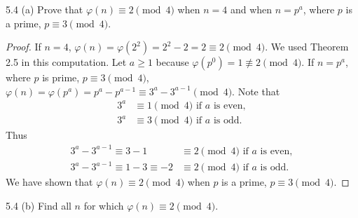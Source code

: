 \begin{exercise}{5.4 (a)}
  Prove that \( \varphi(n) \equiv 2 \pmod{4} \) when \( n = 4 \) and
  when \( n = p^a \), where \( p \) is a prime, \( p \equiv 3
  \pmod{4} \).
\end{exercise}

\begin{proof}
  If \( n = 4 \), \( \varphi(n) = \varphi(2^2) = 2^2 - 2 = 2 \equiv 2
  \pmod{4} \). We used Theorem 2.5 in this computation. Let \( a \ge 1
  \) because \( \varphi(p^0) = 1 \not\equiv 2 \pmod{4} \). If \( n =
  p^a \), where \( p \) is prime, \( p \equiv 3 \pmod{4} \), \(
  \varphi(n) = \varphi(p^a) = p^a - p^{a - 1} \equiv 3^a - 3^{a - 1}
  \pmod{4} \). Note that
  \begin{align*}
    3^a & \equiv 1 \pmod{4} \text{ if } a \text{ is even}, \\
    3^a & \equiv 3 \pmod{4} \text{ if } a \text{ is odd}.
  \end{align*}
  Thus
  \begin{align*}
    3^a - 3^{a - 1} \equiv 3 - 1 & \equiv 2 \pmod{4}
    	\text{ if } a \text{ is even}, \\
    3^a - 3^{a - 1} \equiv 1 - 3 \equiv -2 & \equiv 2 \pmod{4}
    	\text{ if } a \text{ is odd}.
  \end{align*}
  We have shown that \( \varphi(n) \equiv 2 \pmod{4} \) when \( p \)
  is a prime, \( p \equiv 3 \pmod{4} \).
\end{proof}


\begin{exercise}{5.4 (b)}
  Find all \( n \) for which \( \varphi(n) \equiv 2 \pmod{4} \).
\end{exercise}

